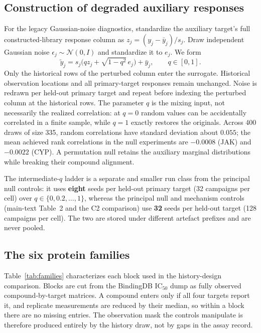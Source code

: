 \documentclass[10pt]{article}
\begin{document}
\subsection{Construction of degraded auxiliary responses}
\label{app:degradation}

For the legacy Gaussian-noise diagnostics, standardize the auxiliary
target's full constructed-library response column as
$z_j=(y_j-\bar y_j)/s_j$. Draw independent Gaussian noise
$\epsilon_j\sim\mathcal N(0,I)$ and standardize it to $e_j$. We form
\[
\widetilde y_j=s_j\big(qz_j+\sqrt{1-q^2}\,e_j\big)+\bar y_j,
\qquad q\in[0,1].
\]
Only the historical rows of the perturbed column enter the surrogate.
Historical observation locations and all primary-target responses remain
unchanged.
Noise is redrawn per held-out primary target and repeat before indexing
the perturbed column at the historical rows. The parameter $q$ is the mixing input, not necessarily the
realized correlation: at $q=0$ random values can be accidentally correlated
in a finite sample, while $q=1$ exactly restores the originals. Across 400
draws of size 335, random correlations have standard deviation about $0.055$;
the mean achieved rank correlations in the null experiments are $-0.0008$
(JAK) and $-0.0022$ (CYP). A permutation null retains the auxiliary marginal
distributions while breaking their compound alignment.

The intermediate-$q$ ladder is a separate and smaller run class from the
principal null controls: it uses \textbf{eight} seeds per held-out primary
target (32 campaigns per cell) over $q\in\{0,0.2,\ldots,1\}$, whereas the
principal null and mechanism controls (main-text Table~2 and the C2
comparison) use \textbf{32} seeds per held-out
target (128 campaigns per cell). The two are stored under different artefact
prefixes and are never pooled.

\subsection{The six protein families}
\label{app:families}

Table~\ref{tab:families} characterizes each block used in the history-design
comparison. Blocks are cut from the BindingDB IC$_{50}$ dump as fully observed
compound-by-target matrices. A compound enters only if all four targets
report it, and replicate measurements are reduced by their median, so within
a block there are no missing entries. The observation mask the controls
manipulate is therefore produced entirely by the history draw, not by gaps in
the assay record.
\end{document}
